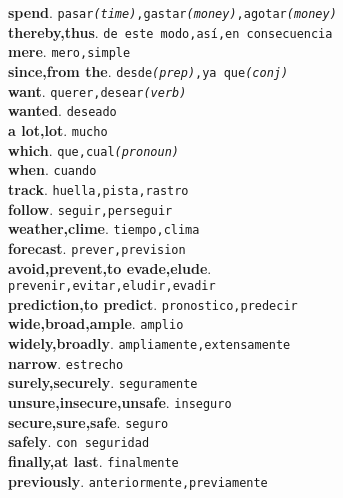 \documentclass[twocolumn]{article}
\begin{document}
	\textsf{\textbf{spend}}. \texttt{pasar{\scriptsize \textsl{(time)}},gastar{\scriptsize \textsl{(money)}},agotar{\scriptsize \textsl{(money)}}}\\
	\textsf{\textbf{thereby,thus}}. \texttt{de este modo,as\'i,en consecuencia}\\
	\textsf{\textbf{mere}}. \texttt{mero,simple}\\
	\textsf{\textbf{since,from the}}. \texttt{desde{\scriptsize \textsl{(prep)}},ya que{\scriptsize \textsl{(conj)}}}\\
	\textsf{\textbf{want}}. \texttt{querer,desear{\scriptsize \textsl{(verb)}}}\\
	\textsf{\textbf{wanted}}. \texttt{deseado}\\
	\textsf{\textbf{a lot,lot}}. \texttt{mucho}\\
	\textsf{\textbf{which}}. \texttt{que,cual{\scriptsize \textsl{(pronoun)}}}\\
	\textsf{\textbf{when}}. \texttt{cuando}\\
	\textsf{\textbf{track}}. \texttt{huella,pista,rastro}\\
	\textsf{\textbf{follow}}. \texttt{seguir,perseguir}\\
	\textsf{\textbf{weather,clime}}. \texttt{tiempo,clima}\\
	\textsf{\textbf{forecast}}. \texttt{prever,prevision}\\
	\textsf{\textbf{avoid,prevent,to evade,elude}}.\\\texttt{prevenir,evitar,eludir,evadir}\\
	\textsf{\textbf{prediction,to predict}}. \texttt{pronostico,predecir}\\
	\textsf{\textbf{wide,broad,ample}}. \texttt{amplio}\\
	\textsf{\textbf{widely,broadly}}. \texttt{ampliamente,extensamente}\\
	\textsf{\textbf{narrow}}. \texttt{estrecho}\\
	\textsf{\textbf{surely,securely}}. \texttt{seguramente}\\
	\textsf{\textbf{unsure,insecure,unsafe}}. \texttt{inseguro}\\
	\textsf{\textbf{secure,sure,safe}}. \texttt{seguro}\\
	\textsf{\textbf{safely}}. \texttt{con seguridad}\\
	\textsf{\textbf{finally,at last}}. \texttt{finalmente}\\
	\textsf{\textbf{previously}}. \texttt{anteriormente,previamente}\\
\end{document}
